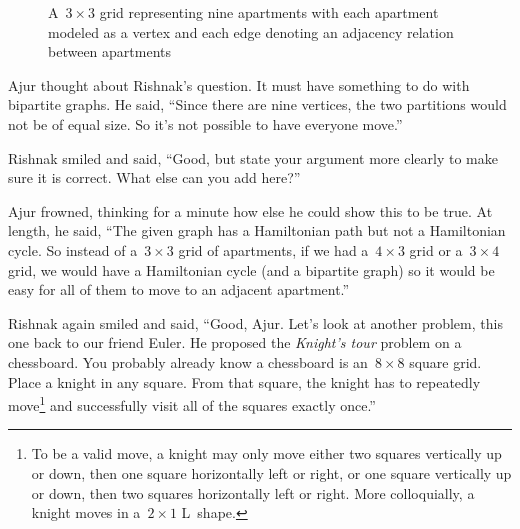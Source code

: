 \begin{figure}
\begin{center}
\caption{A~$3\times3$ grid representing nine apartments with each apartment modeled as a vertex and each edge denoting an adjacency relation between apartments} \label{5g7}
\end{center}
\end{figure}

Ajur thought about Rishnak's question. It must have something to do with bipartite graphs. He said, ``Since there are nine vertices, the two partitions would not be of equal size. So it's not possible to have everyone move.''

Rishnak smiled and said, ``Good, but state your argument more clearly to make sure it is correct. What else can you add here?''

Ajur frowned, thinking for a minute how else he could show this to be true. At length, he said, ``The given graph has a Hamiltonian path but not a Hamiltonian cycle. So instead of a~$3\times3$ grid of apartments, if we had a~$4\times3$ grid or a~$3\times4$ grid, we would have a Hamiltonian cycle (and a bipartite graph) so it would be easy for all of them to move to an adjacent apartment.''

\newpage
Rishnak again smiled and said, ``Good, Ajur. Let's look at another problem, this one back to our friend Euler. He proposed the \textit{Knight's tour} problem on a chessboard. You probably already know a chessboard is an~$8\times8$ square grid. Place a knight in any square. From that square, the knight has to repeatedly move\footnote{To be a valid move, a knight may only move either two squares vertically up or down, then one square horizontally left or right, or one square vertically up or down, then two squares horizontally left or right. More colloquially, a knight moves in a~$2\times1$ L~shape.} and successfully visit all of the squares exactly once.''

